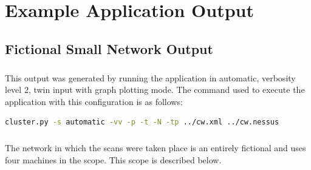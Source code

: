 \chapter{Example Application Output}
\section{Fictional Small Network Output}
\label{fictional}
\paragraph{}This output was generated by running the application in automatic, verbosity level 2, twin input with graph plotting mode. The command used to execute the application with this configuration is as follows: 
\begin{lstlisting}[language=bash]
cluster.py -s automatic -vv -p -t -N -tp ../cw.xml ../cw.nessus
\end{lstlisting}
\paragraph{}The network in which the scans were taken place is an entirely fictional and uses four machines in the scope. This scope is described below.

